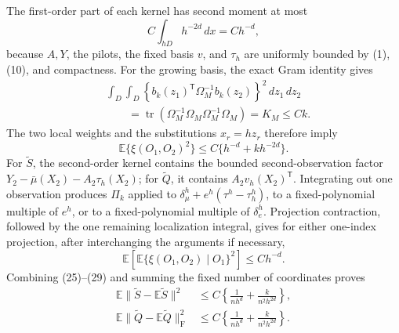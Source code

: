 The first-order part of each kernel has second moment at most
\[
 C\int_{hD}h^{-2d}\,dx=Ch^{-d},
 \tag{26}
\]
because \(A,Y\), the pilots, the fixed basis \(v\), and \(\tau_h\) are uniformly bounded by (1), (10), and compactness.  For the growing basis, the exact Gram identity gives
\[
 \begin{split}
 &\int_D\int_D
 \left\{b_k(z_1)^{\mathsf T}\Omega_M^{-1}b_k(z_2)\right\}^2\,dz_1\,dz_2\\
 &\qquad=\operatorname{tr}\left(
 \Omega_M^{-1}\Omega_M\Omega_M^{-1}\Omega_M\right)
 =K_M\leq Ck.
 \end{split}
 \tag{27}
\]
The two local weights and the substitutions \(x_r=hz_r\) therefore imply
\[
 \mathbb E\{\xi(O_1,O_2)^2\}\leq C\{h^{-d}+kh^{-2d}\}.
 \tag{28}
\]
For \(\widetilde S\), the second-order kernel contains the bounded second-observation factor \(Y_2-\bar\mu(X_2)-A_2\tau_h(X_2)\); for \(\widetilde Q\), it contains \(A_2v_h(X_2)^{\mathsf T}\).  Integrating out one observation produces \(\Pi_k\) applied to \(\delta_\mu^h+e^h(\tau^h-\tau_h^h)\), to a fixed-polynomial multiple of \(e^h\), or to a fixed-polynomial multiple of \(\delta_e^h\).  Projection contraction, followed by the one remaining localization integral, gives for either one-index projection, after interchanging the arguments if necessary,
\[
 \mathbb E\left[\mathbb E\{\xi(O_1,O_2)\mid O_1\}^2\right]\leq Ch^{-d}.
 \tag{29}
\]
Combining (25)--(29) and summing the fixed number of coordinates proves
\[
 \begin{split}
 \mathbb E\|\widetilde S-\mathbb E\widetilde S\|^2
 &\leq C\left\{\frac1{nh^d}+\frac{k}{n^2h^{2d}}\right\},\\
 \mathbb E\|\widetilde Q-\mathbb E\widetilde Q\|_{\mathrm F}^2
 &\leq C\left\{\frac1{nh^d}+\frac{k}{n^2h^{2d}}\right\}.
 \end{split}
 \tag{30}
\]

